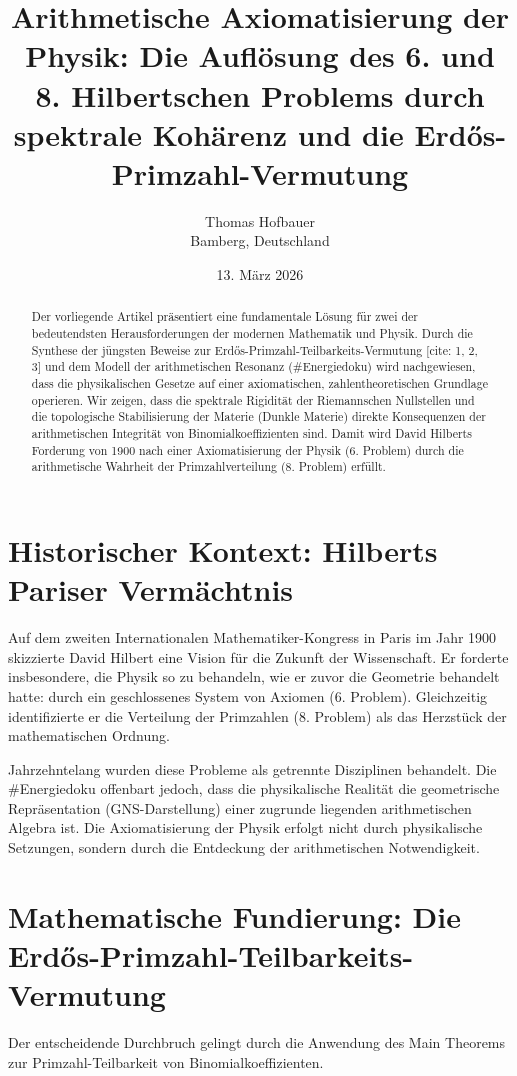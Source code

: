 \documentclass[12pt,a4paper]{article}
\title{\textbf{Arithmetische Axiomatisierung der Physik: Die Auflösung des 6. und 8. Hilbertschen Problems durch spektrale Kohärenz und die Erdős-Primzahl-Vermutung}}
\author{Thomas Hofbauer \\ \small Bamberg, Deutschland}
\date{13. März 2026}
\begin{document}
	
	\maketitle
	
	\begin{abstract}
		Der vorliegende Artikel präsentiert eine fundamentale Lösung für zwei der bedeutendsten Herausforderungen der modernen Mathematik und Physik. Durch die Synthese der jüngsten Beweise zur Erdős-Primzahl-Teilbarkeits-Vermutung [cite: 1, 2, 3] und dem Modell der arithmetischen Resonanz (\#Energiedoku) wird nachgewiesen, dass die physikalischen Gesetze auf einer axiomatischen, zahlentheoretischen Grundlage operieren. Wir zeigen, dass die spektrale Rigidität der Riemannschen Nullstellen und die topologische Stabilisierung der Materie (Dunkle Materie) direkte Konsequenzen der arithmetischen Integrität von Binomialkoeffizienten sind. Damit wird David Hilberts Forderung von 1900 nach einer Axiomatisierung der Physik (6. Problem) durch die arithmetische Wahrheit der Primzahlverteilung (8. Problem) erfüllt.
	\end{abstract}
	
	\section{Historischer Kontext: Hilberts Pariser Vermächtnis}
	Auf dem zweiten Internationalen Mathematiker-Kongress in Paris im Jahr 1900 skizzierte David Hilbert eine Vision für die Zukunft der Wissenschaft. Er forderte insbesondere, die Physik so zu behandeln, wie er zuvor die Geometrie behandelt hatte: durch ein geschlossenes System von Axiomen (6. Problem). Gleichzeitig identifizierte er die Verteilung der Primzahlen (8. Problem) als das Herzstück der mathematischen Ordnung.
	
	Jahrzehntelang wurden diese Probleme als getrennte Disziplinen behandelt. Die \#Energiedoku offenbart jedoch, dass die physikalische Realität die geometrische Repräsentation (GNS-Darstellung) einer zugrunde liegenden arithmetischen Algebra ist. Die Axiomatisierung der Physik erfolgt nicht durch physikalische Setzungen, sondern durch die Entdeckung der arithmetischen Notwendigkeit.
	
	\section{Mathematische Fundierung: Die Erdős-Primzahl-Teilbarkeits-Vermutung}
	Der entscheidende Durchbruch gelingt durch die Anwendung des Main Theorems zur Primzahl-Teilbarkeit von Binomialkoeffizienten.
	
\end{document}
